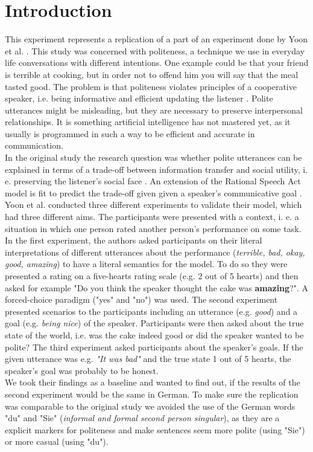 \documentclass[a4paper,11pt]{article}
\begin{document}
\section{Introduction}
This experiment represents a replication of a part of an experiment done by Yoon et al. \cite{yoon2016talking}. This study was concerned with politeness, a technique we use in everyday life conversations with different intentions. One example could be that your friend is terrible at cooking, but in order not to offend him you will say that the meal tasted good. The problem is that politeness violates principles of a cooperative speaker, i.e. being informative and efficient updating the listener \cite{grice1975logic}. Polite utterances might be misleading, but they are necessary to preserve interpersonal relationships. It is something artificial intelligence has not mastered yet, as it usually is programmed in such a way to be efficient and accurate in communication. \\ In the original study the research question was whether polite utterances can be explained in terms of a trade-off between information transfer and social utility, i. e. preserving the listener's social face\cite{brown1987politeness} . An extension of the Rational Speech Act model is fit to predict the trade-off given given a speaker's communicative goal \cite{frank2012predicting}.  Yoon et al. \cite{yoon2016talking} conducted three different experiments to validate their model, which had three different aims. The participants were presented with a context, i. e. a situation in which one person rated another person's performance on some task. In the first experiment, the authors asked participants on their literal interpretations of different utterances about the performance (\textit{terrible, bad, okay, good, amazing}) to have a literal semantics for the model. To do so they were presented a rating on a five-hearts rating scale (e.g. 2 out of 5 hearts) and then asked for example "Do you think the speaker thought the cake was \textbf{amazing}?". A forced-choice paradigm ("yes" and "no") was used. The second experiment presented scenarios to the participants including an utterance (e.g. \textit{good}) and a goal (e.g. \textit{being nice}) of the speaker. Participants were then asked about the true state of the world, i.e. was the cake indeed good or did the speaker wanted to be polite? The third experiment asked participants about the speaker's goals. If the given utterance was e.g. \textit{"It was bad"} and the true state 1 out of 5 hearts, the speaker's goal was probably to be honest. \\ We took their findings as a baseline and wanted to find out, if the results of the second experiment would be the same in German. To make sure the replication was comparable to the original study we avoided the use of the German words "du" and "Sie" (\textit{informal and formal second person singular}), as they are a explicit markers for politeness and make sentences seem more polite (using "Sie") or more casual (using "du"). 
\end{document}
